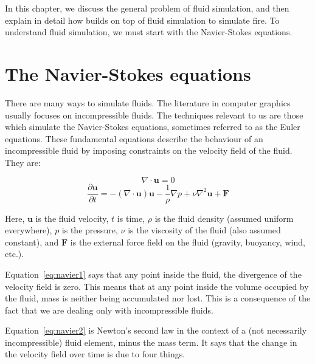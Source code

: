 \documentclass[12pt]{report}
\begin{document}
In this chapter, we discuss the general problem of fluid simulation, and then explain in detail how \cite{ngfeje} builds on top of fluid simulation to simulate fire. To understand fluid simulation, we must start with the Navier-Stokes equations.

\section{The Navier-Stokes equations}

There are many ways to simulate fluids. The literature in computer graphics usually focuses on incompressible fluids. The techniques relevant to us are those which simulate the Navier-Stokes equations, sometimes referred to as the Euler equations. These fundamental equations describe the behaviour of an incompressible fluid by imposing constraints on the velocity field of the fluid. They are:

\begin{equation}\label{eq:navier1}
\nabla \cdot \mathbf{u} = 0
\end{equation}
\begin{equation}\label{eq:navier2}
\dfrac{\partial{\mathbf{u}}}{\partial{t}} = -(\nabla \cdot \mathbf{u})\mathbf{u} - \dfrac{1}{\rho}\nabla p + \nu \nabla^2\mathbf{u} + \mathbf{F}
\end{equation}

Here, $\mathbf{u}$ is the fluid velocity, $t$ is time, $\rho$ is the fluid density (assumed uniform everywhere), $p$ is the pressure, $\nu$ is the viscosity of the fluid (also assumed constant), and $\mathbf{F}$ is the external force field on the fluid (gravity, buoyancy, wind, etc.).

Equation~\ref{eq:navier1} says that any point inside the fluid, the divergence of the velocity field is zero. This means that at any point inside the volume occupied by the fluid, mass is neither being accumulated nor lost. This is a consequence of the fact that we are dealing only with incompressible fluids.

Equation~\ref{eq:navier2} is Newton's second law in the context of a (not necessarily incompressible) fluid element, minus the mass term. It says that the change in the velocity field over time is due to four things.
\end{document}
